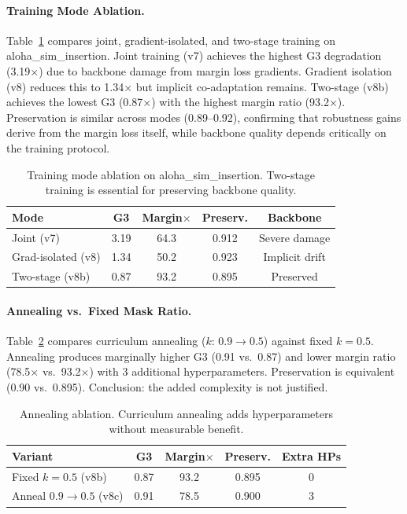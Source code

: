 \documentclass[10pt,twocolumn]{article}
\begin{document}
\paragraph{Training Mode Ablation.}
Table~\ref{tab:ablation_training} compares joint, gradient-isolated, and two-stage training on aloha\_sim\_insertion. Joint training (v7) achieves the highest G3 degradation (3.19$\times$) due to backbone damage from margin loss gradients. Gradient isolation (v8) reduces this to 1.34$\times$ but implicit co-adaptation remains. Two-stage (v8b) achieves the lowest G3 (0.87$\times$) with the highest margin ratio (93.2$\times$). Preservation is similar across modes (0.89--0.92), confirming that robustness gains derive from the margin loss itself, while backbone quality depends critically on the training protocol.

\begin{table}[t]
\centering
\caption{Training mode ablation on aloha\_sim\_insertion. Two-stage training is essential for preserving backbone quality.}
\label{tab:ablation_training}
\small
\begin{tabular}{@{}lcccc@{}}
\toprule
Mode & G3 & Margin$\times$ & Preserv. & Backbone \\
\midrule
Joint (v7) & 3.19 & 64.3 & 0.912 & Severe damage \\
Grad-isolated (v8) & 1.34 & 50.2 & 0.923 & Implicit drift \\
Two-stage (v8b) & 0.87 & 93.2 & 0.895 & Preserved \\
\bottomrule
\end{tabular}
\end{table}

\paragraph{Annealing vs.\ Fixed Mask Ratio.}
Table~\ref{tab:anneal} compares curriculum annealing ($k$: $0.9 \rightarrow 0.5$) against fixed $k{=}0.5$. Annealing produces marginally higher G3 (0.91 vs.\ 0.87) and lower margin ratio (78.5$\times$ vs.\ 93.2$\times$) with 3 additional hyperparameters. Preservation is equivalent (0.90 vs.\ 0.895). Conclusion: the added complexity is not justified.

\begin{table}[t]
\centering
\caption{Annealing ablation. Curriculum annealing adds hyperparameters without measurable benefit.}
\label{tab:anneal}
\small
\begin{tabular}{@{}lcccc@{}}
\toprule
Variant & G3 & Margin$\times$ & Preserv. & Extra HPs \\
\midrule
Fixed $k{=}0.5$ (v8b) & 0.87 & 93.2 & 0.895 & 0 \\
Anneal $0.9{\to}0.5$ (v8c) & 0.91 & 78.5 & 0.900 & 3 \\
\bottomrule
\end{tabular}
\end{table}
\end{document}
